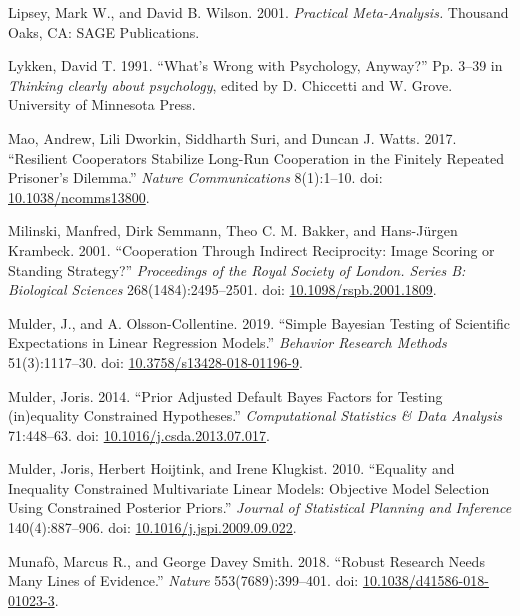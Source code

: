 \documentclass[
  11pt,
]{article}
\newlength{\cslhangindent}
\newlength{\cslentryspacingunit} %
\newenvironment{CSLReferences}[2] %
 {%
  \setlength{\parindent}{0pt}
  \ifodd #1
  \let\oldpar\par
  \def\par{\hangindent=\cslhangindent\oldpar}
  \fi
  \setlength{\parskip}{#2\cslentryspacingunit}
 }%
 {}
\begin{document}
\begin{CSLReferences}{1}{0}
\leavevmode{}%
Lipsey, Mark W., and David B. Wilson. 2001. \emph{Practical {M}eta-{A}nalysis.} Thousand Oaks, CA: SAGE Publications.

\leavevmode{}%
Lykken, David T. 1991. {``What's Wrong with Psychology, Anyway?''} Pp. 3--39 in \emph{Thinking clearly about psychology}, edited by D. Chiccetti and W. Grove. University of Minnesota Press.

\leavevmode{}%
Mao, Andrew, Lili Dworkin, Siddharth Suri, and Duncan J. Watts. 2017. {``Resilient Cooperators Stabilize Long-Run Cooperation in the Finitely Repeated Prisoner's Dilemma.''} \emph{Nature Communications} 8(1):1--10. doi: \href{https://doi.org/10.1038/ncomms13800}{10.1038/ncomms13800}.

\leavevmode{}%
Milinski, Manfred, Dirk Semmann, Theo C. M. Bakker, and Hans-Jürgen Krambeck. 2001. {``Cooperation Through Indirect Reciprocity: Image Scoring or Standing Strategy?''} \emph{Proceedings of the Royal Society of London. Series B: Biological Sciences} 268(1484):2495--2501. doi: \href{https://doi.org/10.1098/rspb.2001.1809}{10.1098/rspb.2001.1809}.

\leavevmode{}%
Mulder, J., and A. Olsson-Collentine. 2019. {``Simple Bayesian Testing of Scientific Expectations in Linear Regression Models.''} \emph{Behavior Research Methods} 51(3):1117--30. doi: \href{https://doi.org/10.3758/s13428-018-01196-9}{10.3758/s13428-018-01196-9}.

\leavevmode{}%
Mulder, Joris. 2014. {``Prior Adjusted Default Bayes Factors for Testing (in)equality Constrained Hypotheses.''} \emph{Computational Statistics \& Data Analysis} 71:448--63. doi: \href{https://doi.org/10.1016/j.csda.2013.07.017}{10.1016/j.csda.2013.07.017}.

\leavevmode{}%
Mulder, Joris, Herbert Hoijtink, and Irene Klugkist. 2010. {``Equality and Inequality Constrained Multivariate Linear Models: Objective Model Selection Using Constrained Posterior Priors.''} \emph{Journal of Statistical Planning and Inference} 140(4):887--906. doi: \href{https://doi.org/10.1016/j.jspi.2009.09.022}{10.1016/j.jspi.2009.09.022}.

\leavevmode{}%
Munafò, Marcus R., and George Davey Smith. 2018. {``Robust Research Needs Many Lines of Evidence.''} \emph{Nature} 553(7689):399--401. doi: \href{https://doi.org/10.1038/d41586-018-01023-3}{10.1038/d41586-018-01023-3}.


\end{CSLReferences}
\end{document}
